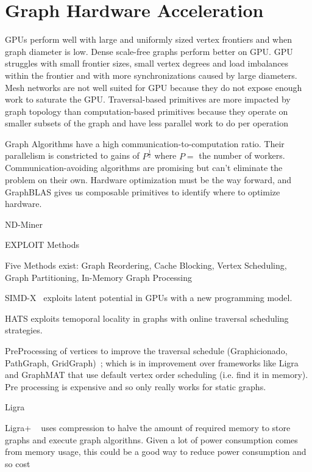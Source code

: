 \section{Graph Hardware Acceleration}
\label{section:13-Graph-Hardware-Acceleration}

GPUs perform well with large and uniformly sized vertex frontiers and when graph diameter is low. 
Dense scale-free graphs perform better on GPU.
GPU struggles with small frontier sizes, small vertex degrees and load imbalances within the frontier and with more synchronizations caused by large diameters. 
Mesh networks are not well suited for GPU because they do not expose enough work to saturate the GPU.
Traversal-based primitives are more impacted by graph topology than computation-based primitives because they operate on smaller subsets of the graph and have less parallel work to do per operation~\cite{Wu2015}

Graph Algorithms have a high communication-to-computation ratio. Their parallelism is constricted to gains of $P^{\frac{1}{2}}$ where $P=$ the number of workers. Communication-avoiding algorithms are promising but can't eliminate the problem on their own. Hardware optimization must be the way forward, and GraphBLAS gives us composable primitives to identify where to optimize hardware.~\cite{Kepner2016}

ND-Miner~\cite{Talati2022}

EXPLOIT Methods

Five Methods exist: Graph Reordering, Cache Blocking, Vertex Scheduling, Graph Partitioning, In-Memory Graph Processing

SIMD-X~\cite{Liu2019} exploits latent potential in GPUs with a new programming model.

HATS exploits temoporal locality in graphs with online traversal scheduling strategies.~\cite{Mukkara2018}

PreProcessing of vertices to improve the traversal schedule (Graphicionado, PathGraph, GridGraph)~\cite{Mukkara2018}; which is in improvement over frameworks like Ligra and GraphMAT that use default vertex order scheduling (i.e. find it in memory). Pre processing is expensive and so only really works for static graphs. 

Ligra ~\cite{Shun2013}

Ligra+ ~\cite{Shun2015} uses compression to halve the amount of required memory to store graphs and execute graph algorithns. Given a lot of power consumption comes from memory usage, this could be a good way to reduce power consumption and so cost 


